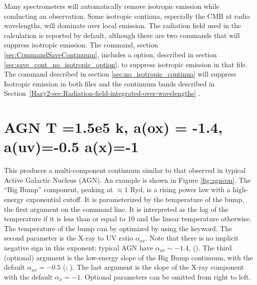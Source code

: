 Many spectrometers will automatically remove isotropic emission while
conducting an observation.  Some isotropic continua, especially the CMB at
radio wavelengths, will dominate over local emission.
The radiation field used in the calculation is reported by default, although
there are two commands that will suppress isotropic emission.
The  command,
section \ref{sec:CommandSaveContinuum}, includes a 
option, described in section \ref{sec:save_cont_no_isotropic_option}, to suppress
isotropic emission in that file.
The  command described
in section \ref{sec:no_isotropic_continua} will suppress
Isotropic emission in both   files
and the continuum bands described in
Section~\ref{Hazy2-sec:Radiation-field-integrated-over-wavelengths}
.


\section{AGN T =1.5e5 k, a(ox) = -1.4, a(uv)=-0.5 a(x)=-1}

This produces a multi-component continuum similar to that observed in
typical Active Galactic Nucleus (AGN).
An example is shown in Figure \ref{fig:agncon}.
The ``Big Bump'' component, peaking at $\approx 1$ Ryd,
is a rising power law with
a high-energy exponential cutoff.
It is parameterized by the temperature
of the bump, the first argument on the command line.
It is interpreted
as the log of the temperature if it is less than or equal to 10 and the
linear temperature otherwise.
The temperature of the bump can by optimized by using the  keyword.
The second parameter is the X-ray to UV ratio
$\alpha_{ox}$.
Note that there
is no implicit negative sign in this exponent; typical AGN have
$\alpha_{ox} \sim
-1.4$, (\citealp{Zamorani1981}).
The third (optional) argument is the
low-energy slope of the Big Bump continuum,
with the default $\alpha_{uv} = -0.5$
(\citealp{Elvis1994}; \citealp{Francis1993}).
The last argument is the slope of the
X-ray component with the default $\alpha_x = -1$.
Optional parameters can be omitted
from right to left.

